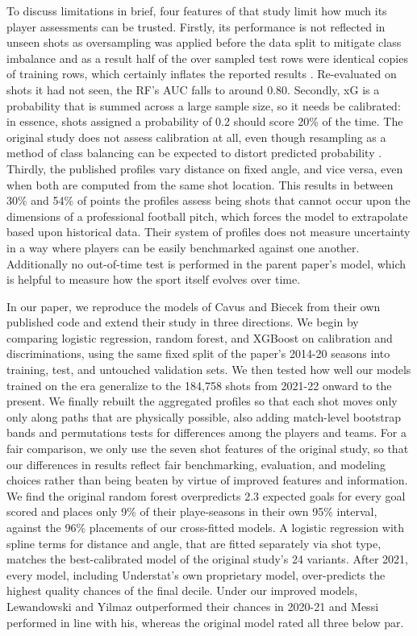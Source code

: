 \documentclass[conference]{IEEEtran}
\begin{document}
To discuss limitations in brief, four features of that study limit how much its player assessments can be trusted. Firstly, its performance is not reflected in unseen shots as oversampling was applied before the data split to mitigate class imbalance and as a result half of the over sampled test rows were identical copies of training rows, which certainly inflates the reported results \cite{kapoor2023}. Re-evaluated on shots it had not seen, the RF's AUC falls to around 0.80. Secondly, xG is a probability that is summed across a large sample size, so it needs be calibrated: in essence, shots assigned a probability of 0.2 should score 20\% of the time. The original study does not assess calibration at all, even though resampling as a method of class balancing can be expected to distort predicted probability \cite{goorbergh2022}. Thirdly, the published profiles vary distance on fixed angle, and vice versa, even when both are computed from the same shot location. This results in between 30\% and 54\% of points the profiles assess being shots that cannot occur upon the dimensions of a professional football pitch, which forces the model to extrapolate based upon historical data. Their system of profiles does not measure uncertainty in a way where players can be easily benchmarked against one another. Additionally no out-of-time test is performed in the parent paper's model, which is helpful to measure how the sport itself evolves over time.

In our paper, we reproduce the models of Cavus and Biecek \cite{cavus2022} from their own published code and extend their study in three directions. We begin by comparing logistic regression, random forest, and XGBoost on calibration and discriminations, using the same fixed split of the paper's 2014-20 seasons into training, test, and untouched validation sets. We then tested how well our models trained on the era generalize to the 184,758 shots from 2021-22 onward to the present. We finally rebuilt the aggregated profiles so that each shot moves only only along paths that are physically possible, also adding match-level bootstrap bands and permutations tests for differences among the players and teams. For a fair comparison, we only use the seven shot features of the original study, so that our differences in results reflect fair benchmarking, evaluation, and modeling choices rather than being beaten by virtue of improved features and information. We find the original random forest overpredicts 2.3 expected goals for every goal scored and places only 9\% of their playe-seasons in their own 95\% interval, against the 96\% placements of our cross-fitted models. A logistic regression with spline terms for distance and angle, that are fitted separately via shot type, matches the best-calibrated model of the original study's 24 variants. After 2021, every model, including Understat's own proprietary model, over-predicts the highest quality chances of the final decile. Under our improved models, Lewandowski and Yilmaz outperformed their chances in 2020-21 and Messi performed in line with his, whereas the original model rated all three below par.
\end{document}
